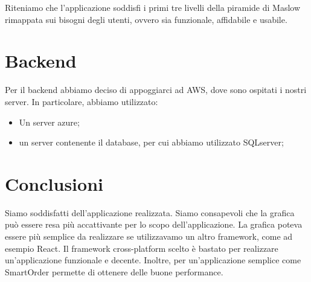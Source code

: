 \documentclass[12pt, a4paper, titlepage]{report}
\begin{document}
	Riteniamo che l'applicazione soddisfi i primi tre livelli della piramide di Maslow rimappata sui bisogni degli utenti, ovvero sia funzionale, affidabile e usabile.
	
	\section{Backend}
	Per il backend abbiamo deciso di appoggiarci ad AWS, dove sono ospitati i nostri server. In particolare, abbiamo utilizzato:
	\begin{itemize}
		\item Un server azure;
		\item un server contenente il database, per cui abbiamo utilizzato SQLserver;
	\end{itemize}
	
	\section{Conclusioni}
	Siamo soddisfatti dell'applicazione realizzata. Siamo consapevoli che la grafica può essere resa più accattivante per lo scopo dell'applicazione. La grafica poteva essere più semplice da realizzare se utilizzavamo un altro framework, come ad esempio React. 
	Il framework cross-platform scelto è bastato per realizzare un'applicazione funzionale e decente. Inoltre, per un'applicazione semplice come SmartOrder permette di ottenere delle buone performance.
\end{document}
